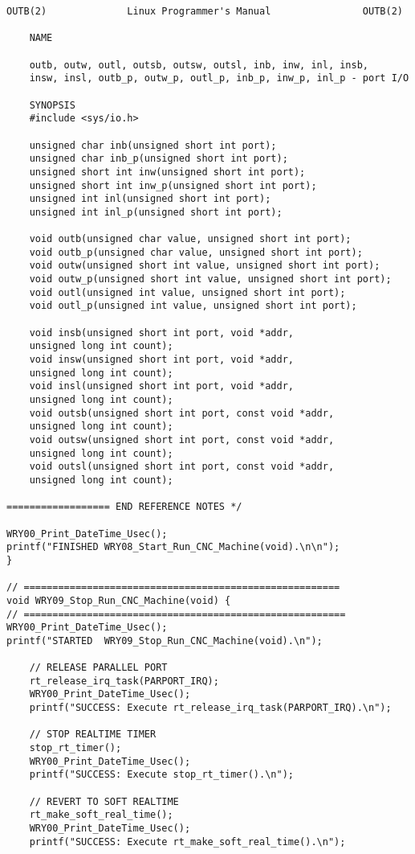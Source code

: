 \begin{lstlisting}[caption={App4-Full C-Code listing for Real Time (RTAI)}, label=App4-Full C-Code listing for Real Time (RTAI)]
	OUTB(2)              Linux Programmer's Manual                OUTB(2)	
	
	NAME
	
	outb, outw, outl, outsb, outsw, outsl, inb, inw, inl, insb, 
	insw, insl, outb_p, outw_p, outl_p, inb_p, inw_p, inl_p - port I/O

	SYNOPSIS
	#include <sys/io.h>

	unsigned char inb(unsigned short int port);
	unsigned char inb_p(unsigned short int port);
	unsigned short int inw(unsigned short int port);
	unsigned short int inw_p(unsigned short int port);
	unsigned int inl(unsigned short int port);
	unsigned int inl_p(unsigned short int port);

	void outb(unsigned char value, unsigned short int port);
	void outb_p(unsigned char value, unsigned short int port);
	void outw(unsigned short int value, unsigned short int port);
	void outw_p(unsigned short int value, unsigned short int port);
	void outl(unsigned int value, unsigned short int port);
	void outl_p(unsigned int value, unsigned short int port);

	void insb(unsigned short int port, void *addr,
	unsigned long int count);
	void insw(unsigned short int port, void *addr,
	unsigned long int count);
	void insl(unsigned short int port, void *addr,
	unsigned long int count);
	void outsb(unsigned short int port, const void *addr,
	unsigned long int count);
	void outsw(unsigned short int port, const void *addr,
	unsigned long int count);
	void outsl(unsigned short int port, const void *addr,
	unsigned long int count);

================== END REFERENCE NOTES */

WRY00_Print_DateTime_Usec(); 
printf("FINISHED WRY08_Start_Run_CNC_Machine(void).\n\n");
}

// =======================================================
void WRY09_Stop_Run_CNC_Machine(void) {
// ========================================================
WRY00_Print_DateTime_Usec(); 
printf("STARTED  WRY09_Stop_Run_CNC_Machine(void).\n");

	// RELEASE PARALLEL PORT 
	rt_release_irq_task(PARPORT_IRQ);
	WRY00_Print_DateTime_Usec(); 
	printf("SUCCESS: Execute rt_release_irq_task(PARPORT_IRQ).\n");
	
	// STOP REALTIME TIMER
	stop_rt_timer();
	WRY00_Print_DateTime_Usec(); 
	printf("SUCCESS: Execute stop_rt_timer().\n");
	
	// REVERT TO SOFT REALTIME
	rt_make_soft_real_time();
	WRY00_Print_DateTime_Usec(); 
	printf("SUCCESS: Execute rt_make_soft_real_time().\n");
	

\end{lstlisting}
